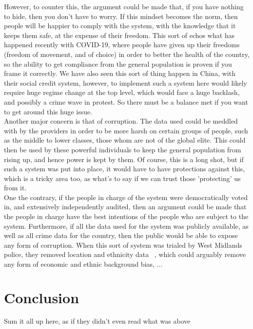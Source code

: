 \documentclass[12pt]{amsart}
\begin{document}
    However, to counter this, the argument could be made that, if you have nothing to hide, then you don't have to
    worry.
    If this mindset becomes the norm, then people will be happier to comply with the system, with the knowledge that
    it keeps them safe, at the expense of their freedom.
    This sort of echos what has happened recently with COVID-19, where people have given up their freedoms (freedom of
    movement, and of choice) in order to better the health of the country, so the ability to get compliance from the
    general population is proven if you frame it correctly.
    We have also seen this sort of thing happen in China, with their social credit system, however, to implement such a
    system here would likely require huge regime change at the top level, which would face a huge backlash, and
    possibly a crime wave in protest.
    So there must be a balance met if you want to get around this huge issue.
    \\

    Another major concern is that of corruption.
    The data used could be meddled with by the providers in order to be more harsh on certain groups of people, such as
    the middle to lower classes, those whom are not of the global elite.
    This could then be used by these powerful individuals to keep the general population from rising up, and hence power
    is kept by them.
    Of course, this is a long shot, but if such a system was put into place, it would have to have protections against
    this, which is a tricky area too, as what's to say if we can trust those 'protecting' us from it.
    \\

    One the contrary, if the people in charge of the system were democratically voted in, and extensively independently
    audited, then an argument could be made that the people in charge have the best intentions of the people who are
    subject to the system.
    Furthermore, if all the data used for the system was publicly available, as well as all crime data for the country,
    then the public would be able to expose any form of corruption.
    When this sort of system was trialed by West Midlands police, they removed location and ethnicity data
    ~\cite{wmp-trial}, which could arguably remove any form of economic and ethnic background bias, ...



    \section{Conclusion}\label{sec:conclusion}

    Sum it all up here, as if they didn't even read what was above ~\cite{mr-book}

    {}
    
\end{document}
